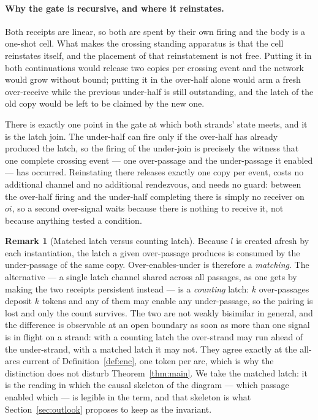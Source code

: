 \documentclass[11pt]{article}
\theoremstyle{definition}
\newtheorem{remark}{Remark}
\begin{document}
\paragraph{Why the gate is recursive, and where it reinstates.}
Both receipts are linear, so both are spent by their own firing and the body is a
one-shot cell. What makes the crossing standing apparatus is that the cell
reinstates itself, and the placement of that reinstatement is not free. Putting it
in both continuations would release two copies per crossing event and the network
would grow without bound; putting it in the over-half alone would arm a fresh
over-receive while the previous under-half is still outstanding, and the latch of
the old copy would be left to be claimed by the new one.

There is exactly one point in the gate at which both strands' state meets, and it
is the latch join. The under-half can fire only if the over-half has already
produced the latch, so the firing of the under-join is precisely the witness that
one complete crossing event --- one over-passage and the under-passage it enabled
--- has occurred. Reinstating there releases exactly one copy per event, costs no
additional channel and no additional rendezvous, and needs no guard: between the
over-half firing and the under-half completing there is simply no receiver on
$oi$, so a second over-signal waits because there is nothing to receive it, not
because anything tested a condition.

\begin{remark}[Matched latch versus counting latch]\label{rem:matched}
Because $l$ is created afresh by each instantiation, the latch a given over-passage
produces is consumed by the under-passage of the same copy. Over-enables-under is
therefore a \emph{matching}. The alternative --- a single latch channel shared
across all passages, as one gets by making the two receipts persistent instead ---
is a \emph{counting} latch: $k$ over-passages deposit $k$ tokens and any of them
may enable any under-passage, so the pairing is lost and only the count survives.
The two are not weakly bisimilar in general, and the difference is observable at
an open boundary as soon as more than one signal is in flight on a strand: with a
counting latch the over-strand may run ahead of the under-strand, with a matched
latch it may not. They agree exactly at the all-arcs current of
Definition~\ref{def:enc}, one token per arc, which is why the distinction does not
disturb Theorem~\ref{thm:main}. We take the matched latch: it is the reading in
which the causal skeleton of the diagram --- which passage enabled which --- is
legible in the term, and that skeleton is what Section~\ref{sec:outlook} proposes
to keep as the invariant.
\end{remark}
\end{document}

